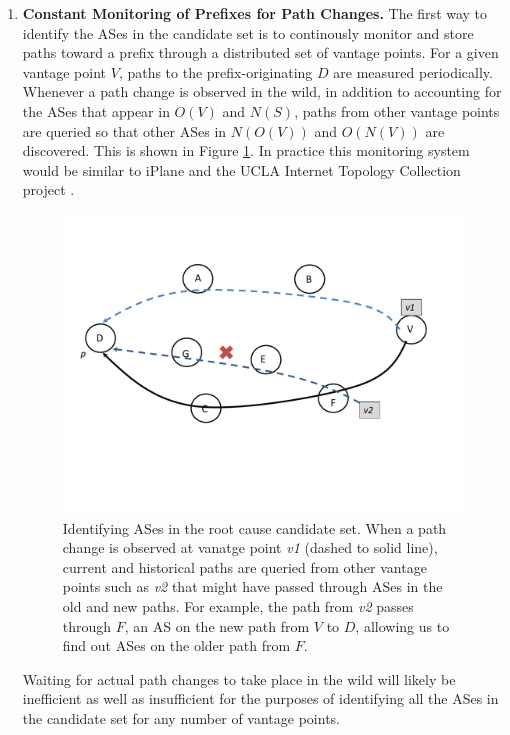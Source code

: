 \begin{enumerate}

\item \textbf{Constant Monitoring of Prefixes for Path Changes.} The first
way to identify the ASes in the candidate set is to continously monitor
and store paths toward a prefix through a distributed set of vantage points. For a 
given vantage point $V$, paths to the prefix-originating $D$ are measured 
periodically. Whenever a path change is observed in the wild, in addition 
to accounting for the ASes that appear in $O(V)$ and $N(S)$, paths from
other vantage points are queried so that other ASes in $N(O(V))$
and $O(N(V))$ are discovered. This is shown in Figure \ref{fig:computeset}. 
In practice this monitoring system would be similar to iPlane \cite{iplane} and 
the UCLA Internet Topology Collection project \cite{ucla-topology}.

\begin{figure}[!htbp]
\centering\includegraphics[width=\columnwidth]{figs/computeset.pdf}
\caption{Identifying ASes in the root cause candidate set. When a path change
is observed at vanatge point \emph{v1} (dashed to solid line), 
current and historical paths are queried from other vantage 
points such as \emph{v2} that might have passed through ASes in the old
and new paths. For example, the path from \emph{v2} passes through $F$, an AS
on the new path from $V$ to $D$, allowing us to find out ASes on the
older path from $F$.}
\label{fig:computeset}
\end{figure}

Waiting for actual path changes to take place in the wild will
likely be inefficient as well as insufficient for the purposes of identifying
all the ASes in the candidate set for any number of vantage points. 


\end{enumerate}
